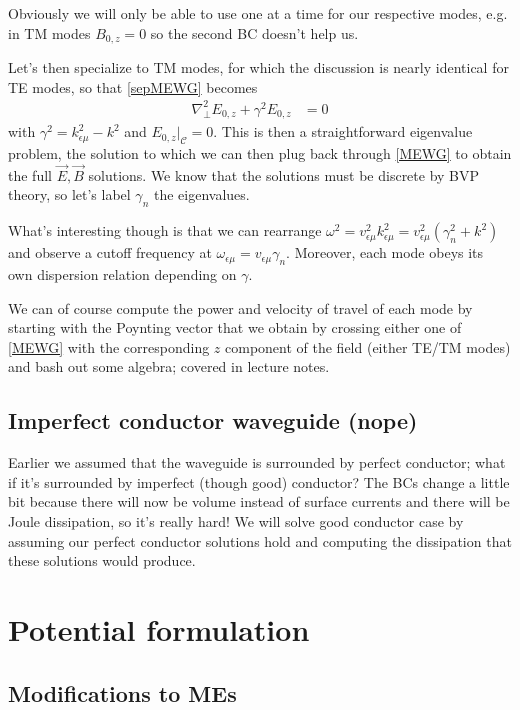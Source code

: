 \documentclass[10pt,twocolumn]{article}
\begin{document}
Obviously we will only be able to use one at a time for our respective modes, e.g. in TM modes $B_{0,z} = 0$ so the second BC doesn't help us.

Let's then specialize to TM modes, for which the discussion is nearly identical for TE modes, so that \eqref{sepMEWG} becomes
\begin{align}
    \nabla_\perp^2E_{0,z} + \gamma^2 E_{0,z} &= 0
\end{align}
with $\gamma^2 = k_{\epsilon \mu}^2 - k^2$ and $E_{0,z}|_{\mathcal{C}} = 0$. This is then a straightforward eigenvalue problem, the solution to which we can then plug back through \eqref{MEWG} to obtain the full $\vec{E}, \vec{B}$ solutions. We know that the solutions must be discrete by BVP theory, so let's label $\gamma_n$ the eigenvalues.

What's interesting though is that we can rearrange $\omega^2 = v_{\epsilon \mu}^2 k_{\epsilon \mu}^2 = v_{\epsilon \mu}^2 \left( \gamma_n^2 + k^2 \right)$ and observe a cutoff frequency at $\omega_{\epsilon \mu} = v_{\epsilon \mu}\gamma_n$. Moreover, each mode obeys its own dispersion relation depending on $\gamma$.

We can of course compute the power and velocity of travel of each mode by starting with the Poynting vector that we obtain by crossing either one of \eqref{MEWG} with the corresponding $z$ component of the field (either TE/TM modes) and bash out some algebra; covered in lecture notes.

\subsection{Imperfect conductor waveguide (nope)}

Earlier we assumed that the waveguide is surrounded by perfect conductor; what if it's surrounded by imperfect (though good) conductor? The BCs change a little bit because there will now be volume instead of surface currents and there will be Joule dissipation, so it's really hard! We will solve good conductor case by assuming our perfect conductor solutions hold and computing the dissipation that these solutions would produce.

\section{Potential formulation} 

\subsection{Modifications to MEs}
\end{document}
